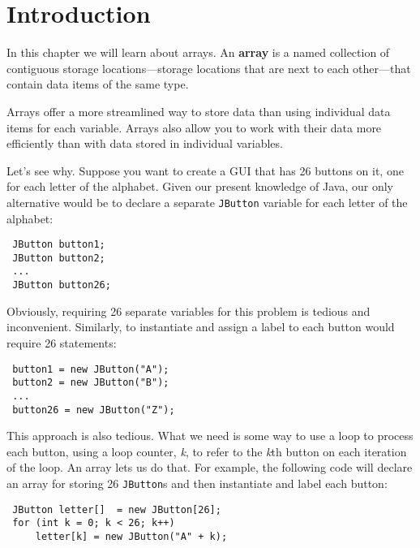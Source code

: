\section{Introduction}
\label{introduction}

\noindent In this chapter we will learn about arrays.  An {\bf array} 
is a named collection of contiguous storage locations---storage
locations that are next to each other---that contain data items of the
same type.

Arrays offer a more streamlined way to store data than using
individual data items for each variable.  Arrays also allow you to
work with their data more efficiently than with data stored in
individual variables.

Let's see why.  Suppose you want to create a GUI that has 26 buttons
on it, one for each letter of the alphabet.  Given our present
knowledge of Java, our only alternative would be to declare a separate
{\tt JButton} variable for each letter of the alphabet:

\begin{jjjlisting}
\begin{lstlisting}
 JButton button1;
 JButton button2;
 ...
 JButton button26;
\end{lstlisting}
\end{jjjlisting}

\noindent Obviously, requiring 26 separate variables for this
problem is tedious and inconvenient. Similarly, to instantiate and
assign a label to each button would require 26 statements:

\begin{jjjlisting}
\begin{lstlisting}
 button1 = new JButton("A");
 button2 = new JButton("B");
 ...
 button26 = new JButton("Z");
\end{lstlisting}
\end{jjjlisting}

\noindent This approach is also tedious.  What we need is some way to
use a loop to process each button, using a loop counter, {\it k}, to
refer to the {\it k}th button on each iteration of the loop.  An array
lets us do that.  For example, the following code will declare an
array for storing 26 {\tt JButton}s and then instantiate and label
each button:

\begin{jjjlisting}\begin{lstlisting}
 JButton letter[]  = new JButton[26];
 for (int k = 0; k < 26; k++)
     letter[k] = new JButton("A" + k);
\end{lstlisting}
\end{jjjlisting}

